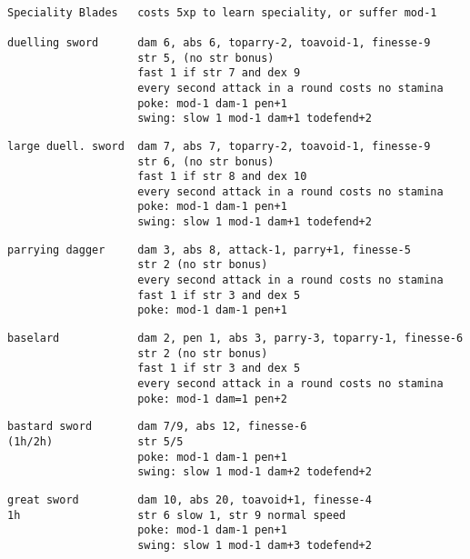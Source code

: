 \

\goodbreak \small \begin{samepage} \begin{verbatim}
Speciality Blades   costs 5xp to learn speciality, or suffer mod-1

duelling sword      dam 6, abs 6, toparry-2, toavoid-1, finesse-9
                    str 5, (no str bonus)
                    fast 1 if str 7 and dex 9
                    every second attack in a round costs no stamina
                    poke: mod-1 dam-1 pen+1
                    swing: slow 1 mod-1 dam+1 todefend+2
\end{verbatim} \blocklistgap \begin{verbatim}
large duell. sword  dam 7, abs 7, toparry-2, toavoid-1, finesse-9
                    str 6, (no str bonus)
                    fast 1 if str 8 and dex 10
                    every second attack in a round costs no stamina
                    poke: mod-1 dam-1 pen+1
                    swing: slow 1 mod-1 dam+1 todefend+2
\end{verbatim} \blocklistgap \begin{verbatim}
parrying dagger     dam 3, abs 8, attack-1, parry+1, finesse-5
                    str 2 (no str bonus)
                    every second attack in a round costs no stamina
                    fast 1 if str 3 and dex 5
                    poke: mod-1 dam-1 pen+1
\end{verbatim} \blocklistgap \begin{verbatim}
baselard            dam 2, pen 1, abs 3, parry-3, toparry-1, finesse-6
                    str 2 (no str bonus)
                    fast 1 if str 3 and dex 5
                    every second attack in a round costs no stamina
                    poke: mod-1 dam=1 pen+2
\end{verbatim} \blocklistgap \begin{verbatim}
bastard sword       dam 7/9, abs 12, finesse-6
(1h/2h)             str 5/5
                    poke: mod-1 dam-1 pen+1
                    swing: slow 1 mod-1 dam+2 todefend+2
\end{verbatim} \blocklistgap \begin{verbatim}
great sword         dam 10, abs 20, toavoid+1, finesse-4
1h                  str 6 slow 1, str 9 normal speed
                    poke: mod-1 dam-1 pen+1
                    swing: slow 1 mod-1 dam+3 todefend+2
\end{verbatim} \blocklistgap \begin{verbatim}

\end{verbatim}
\end{samepage}
